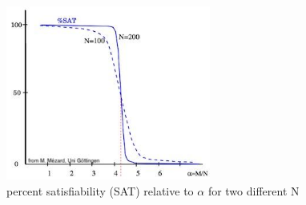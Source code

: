 \documentclass[]{article}
\begin{document}
\begin{figure}[H]
	\begin{center}
		\caption{percent satisfiability (SAT) relative to $\alpha$ for two different N}\label{fig:content_SATalpha}
		\includegraphics[width=0.6\textwidth]{content_SATalpha}
	\end{center}
\end{figure}


\raggedright
{}

\end{document}
